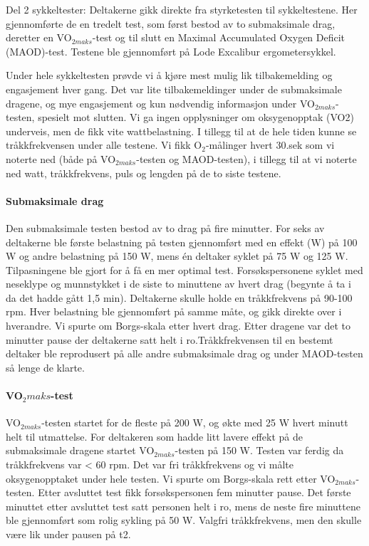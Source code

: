 \documentclass[
  letterpaper,
  DIV=11,
  numbers=noendperiod]{scrartcl}
\let\oldparagraph\paragraph
\renewcommand{\paragraph}[1]{\oldparagraph{#1}\mbox{}}
\begin{document}
Del 2 sykkeltester: Deltakerne gikk direkte fra styrketesten til
sykkeltestene. Her gjennomførte de en tredelt test, som først bestod av
to submaksimale drag, deretter en VO\(_{2maks}\)-test og til slutt en
Maximal Accumulated Oxygen Deficit (MAOD)-test. Testene ble gjennomført
på Lode Excalibur ergometersykkel.

Under hele sykkeltesten prøvde vi å kjøre mest mulig lik tilbakemelding
og engasjement hver gang. Det var lite tilbakemeldinger under de
submaksimale dragene, og mye engasjement og kun nødvendig informasjon
under VO\(_{2maks}\)-testen, spesielt mot slutten. Vi ga ingen
opplysninger om oksygenopptak (VO2) underveis, men de fikk vite
wattbelastning. I tillegg til at de hele tiden kunne se tråkkfrekvensen
under alle testene. Vi fikk O\(_2\)-målinger hvert 30.sek som vi noterte
ned (både på VO\(_{2maks}\)-testen og MAOD-testen), i tillegg til at vi
noterte ned watt, tråkkfrekvens, puls og lengden på de to siste testene.

\hypertarget{submaksimale-drag}{%
\paragraph{Submaksimale drag}\label{submaksimale-drag}}

Den submaksimale testen bestod av to drag på fire minutter. For seks av
deltakerne ble første belastning på testen gjennomført med en effekt (W)
på 100 W og andre belastning på 150 W, mens én deltaker syklet på 75 W
og 125 W. Tilpasningene ble gjort for å få en mer optimal test.
Forsøkspersonene syklet med neseklype og munnstykket i de siste to
minuttene av hvert drag (begynte å ta i da det hadde gått 1,5 min).
Deltakerne skulle holde en tråkkfrekvens på 90-100 rpm. Hver belastning
ble gjennomført på samme måte, og gikk direkte over i hverandre. Vi
spurte om Borgs-skala etter hvert drag. Etter dragene var det to
minutter pause der deltakerne satt helt i ro.Tråkkfrekvensen til en
bestemt deltaker ble reprodusert på alle andre submaksimale drag og
under MAOD-testen så lenge de klarte.

\hypertarget{vo_2maks-test}{%
\paragraph{\texorpdfstring{VO\(_2maks\)-test}{VO\_2maks-test}}\label{vo_2maks-test}}

VO\(_{2maks}\)-testen startet for de fleste på 200 W, og økte med 25 W
hvert minutt helt til utmattelse. For deltakeren som hadde litt lavere
effekt på de submaksimale dragene startet VO\(_{2maks}\)-testen på 150
W. Testen var ferdig da tråkkfrekvens var \textless{} 60 rpm. Det var
fri tråkkfrekvens og vi målte oksygenopptaket under hele testen. Vi
spurte om Borgs-skala rett etter VO\(_{2maks}\)-testen. Etter avsluttet
test fikk forsøkspersonen fem minutter pause. Det første minuttet etter
avsluttet test satt personen helt i ro, mens de neste fire minuttene ble
gjennomført som rolig sykling på 50 W. Valgfri tråkkfrekvens, men den
skulle være lik under pausen på t2.
\end{document}
